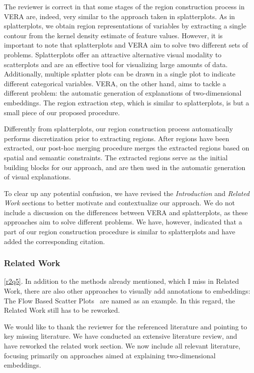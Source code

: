\documentclass{article}
\newcounter{rtaskno}
\newcommand{\rtask}[1]{\refstepcounter{rtaskno}\label{#1}}
\newcommand{\reviewc}[2]{\begin{leftbar}\noindent\rtask{#1}\ref{#1}. #2\end{leftbar}}
\newcommand{\answer}[1]{\noindent #1\\[0mm]}
\newlength{\leftbarwidth}
\newlength{\leftbarsep}
\renewenvironment{leftbar}{%
    \def\FrameCommand{{\color{black}{\vrule width \leftbarwidth\relax\hspace {\leftbarsep}}}}%
    \MakeFramed {\advance \hsize -\width \FrameRestore }%
}{\endMakeFramed}
\begin{document}
\answer{The reviewer is correct in that some stages of the region construction process in VERA are, indeed, very similar to the approach taken in splatterplots. As in splatterplots, we obtain region representations of variables by extracting a single contour from the kernel density estimate of feature values.
However, it is important to note that splatterplots and VERA aim to solve two different sets of problems.
Splatterplots offer an attractive alternative visual modality to scatterplots and are an effective tool for visualizing large amounts of data. Additionally, multiple splatter plots can be drawn in a single plot to indicate different categorical variables.
VERA, on the other hand, aims to tackle a different problem: the automatic generation of explanations of two-dimensional embeddings. The region extraction step, which is similar to splatterplots, is but a small piece of our proposed procedure.

Differently from splatterplots, our region construction process automatically performs discretization prior to extracting regions. After regions have been extracted, our post-hoc merging procedure merges the extracted regions based on spatial and semantic constraints.
The extracted regions serve as the initial building blocks for our approach, and are then used in the automatic generation of visual explanations.

To clear up any potential confusion, we have revised the \textit{Introduction} and \textit{Related Work} sections to better motivate and contextualize our approach. We do not include a discussion on the differences between VERA and splatterplots, as these approaches aim to solve different problems.
We have, however, indicated that a part of our region construction procedure is similar to splatterplots and have added the corresponding citation.}

\subsubsection*{Related Work}


\reviewc{r2q5}{In addition to the methods already mentioned, which I miss in Related Work, there are also other approaches to visually add annotations to embeddings: The Flow Based Scatter Plots~\cite{Chan2010} are named as an example. In this regard, the Related Work still has to be reworked.}

\answer{We would like to thank the reviewer for the referenced literature and pointing to key missing literature. We have conducted an extensive literature review, and have reworked the related work section. We now include all relevant literature, focusing primarily on approaches aimed at explaining two-dimensional embeddings.}
   
\end{document}

